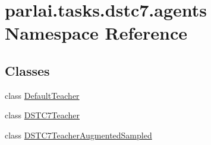 \hypertarget{namespaceparlai_1_1tasks_1_1dstc7_1_1agents}{}\section{parlai.\+tasks.\+dstc7.\+agents Namespace Reference}
\label{namespaceparlai_1_1tasks_1_1dstc7_1_1agents}
\subsection*{Classes}
\begin{DoxyCompactItemize}
\item 
class \hyperlink{classparlai_1_1tasks_1_1dstc7_1_1agents_1_1DefaultTeacher}{Default\+Teacher}
\item 
class \hyperlink{classparlai_1_1tasks_1_1dstc7_1_1agents_1_1DSTC7Teacher}{D\+S\+T\+C7\+Teacher}
\item 
class \hyperlink{classparlai_1_1tasks_1_1dstc7_1_1agents_1_1DSTC7TeacherAugmentedSampled}{D\+S\+T\+C7\+Teacher\+Augmented\+Sampled}
\end{DoxyCompactItemize}
